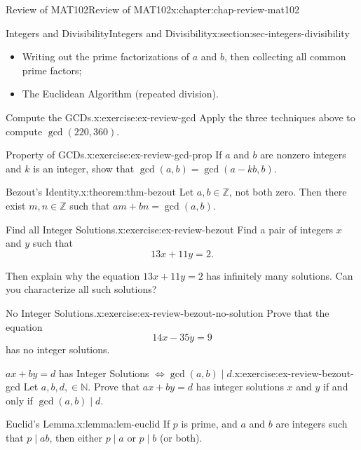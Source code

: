 \documentclass[oneside,10pt,]{book}
\numberwithin{equation}{section}
\begin{document}
\begin{chapterptx}{Review of MAT102}{}{Review of MAT102}{}{}{x:chapter:chap-review-mat102}
\begin{sectionptx}{Integers and Divisibility}{}{Integers and Divisibility}{}{}{x:section:sec-integers-divisibility}
\begin{itemize}[label=\textbullet]
\item{}Writing out the prime factorizations of \(a\) and \(b\), then collecting all common prime factors;%
\item{}The Euclidean Algorithm (repeated division).%
\end{itemize}
%
\begin{inlineexercise}{Compute the GCDs.}{x:exercise:ex-review-gcd}%
Apply the three techniques above to compute \(\gcd(220,360)\).%
\end{inlineexercise}%
\begin{inlineexercise}{Property of GCDs.}{x:exercise:ex-review-gcd-prop}%
If \(a\) and \(b\) are nonzero integers and \(k\) is an integer, show that \(\gcd(a,b) = \gcd(a-kb,b)\).%
\end{inlineexercise}%
\begin{theorem}{Bezout's Identity.}{}{x:theorem:thm-bezout}%
Let \(a,b \in \mathbb{Z}\), not both zero. Then there exist \(m,n \in \mathbb{Z}\) such that \(am + bn = \gcd(a,b)\).%
\end{theorem}
\begin{inlineexercise}{Find all Integer Solutions.}{x:exercise:ex-review-bezout}%
Find a pair of integers \(x\) and \(y\) such that%
\begin{equation*}
13x + 11y = 2\text{.}
\end{equation*}
%
\par
Then explain why the equation \(13x + 11y = 2\) has infinitely many solutions. Can you characterize all such solutions?%
\end{inlineexercise}%
\begin{inlineexercise}{No Integer Solutions.}{x:exercise:ex-review-bezout-no-solution}%
Prove that the equation%
\begin{equation*}
14x - 35y = 9
\end{equation*}
has no integer solutions.%
\end{inlineexercise}%
\begin{inlineexercise}{\(ax + by = d\) has Integer Solutions \(\Leftrightarrow \gcd(a,b) \mid d\).}{x:exercise:ex-review-bezout-gcd}%
Let \(a, b, d, \in \mathbb{N}\). Prove that \(ax + by = d\) has integer solutions \(x\) and \(y\) if and only if \(\gcd(a,b) \mid d\).%
\end{inlineexercise}%
\begin{lemma}{Euclid's Lemma.}{}{x:lemma:lem-euclid}%
If \(p\) is prime, and \(a\) and \(b\) are integers such that \(p \mid ab\), then either \(p \mid a\) or \(p \mid b\) (or both).%
\end{lemma}

\end{sectionptx}
\end{chapterptx}
\end{document}
